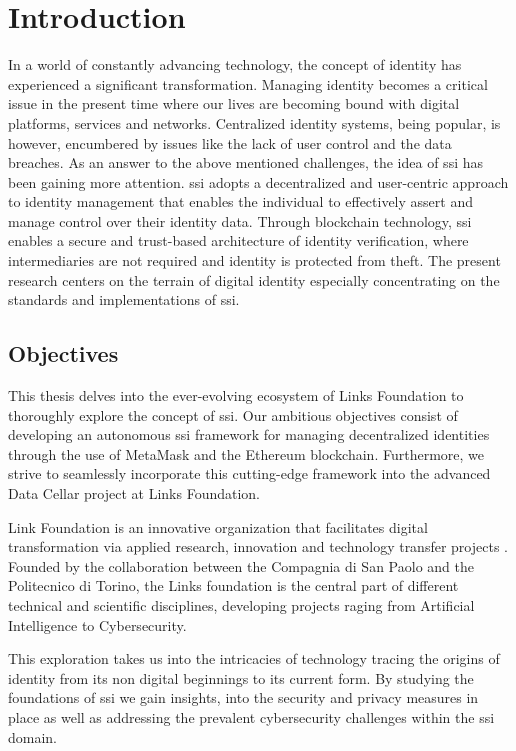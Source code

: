 \chapter{Introduction} \label{ch:introduction}

In a world of constantly advancing technology, the concept of identity has experienced a significant transformation. Managing identity becomes a critical issue in the 
present time where our lives are becoming bound with digital platforms, services and networks. Centralized identity systems, being popular, is however, encumbered by 
issues like the lack of user control and the data breaches. As an answer to the above mentioned challenges, the idea of \acrfull{ssi} has been gaining more attention. \gls{ssi} 
adopts a decentralized and user-centric approach to identity management that enables the individual to effectively assert and manage control over their identity data. 
Through blockchain technology, \gls{ssi} enables a secure and trust-based architecture of identity verification, where intermediaries are not required and identity is 
protected from theft. The present research centers on the terrain of digital identity especially concentrating on the standards and implementations of \gls{ssi}.

\section{Objectives} 

This thesis delves into the ever-evolving ecosystem of Links Foundation to thoroughly explore the concept of \gls{ssi}. Our ambitious objectives 
consist of developing an autonomous \gls{ssi} framework for managing decentralized identities through the use of MetaMask and the Ethereum blockchain. Furthermore, we strive to 
seamlessly incorporate this cutting-edge framework into the advanced Data Cellar project at Links Foundation.

Link Foundation is an innovative organization that facilitates digital transformation via applied research, innovation and technology transfer projects \cite{linksfoundation}.
Founded by the collaboration between the Compagnia di San Paolo and the Politecnico di Torino, the Links foundation is the central part of different technical and scientific 
disciplines, developing projects raging from Artificial Intelligence to Cybersecurity.

This exploration takes us into the intricacies of technology tracing the origins of identity from its non digital beginnings to its current form. By studying the foundations
of \gls{ssi} we gain insights, into the security and privacy measures in place as well as addressing the prevalent cybersecurity challenges within the \gls{ssi} domain.

